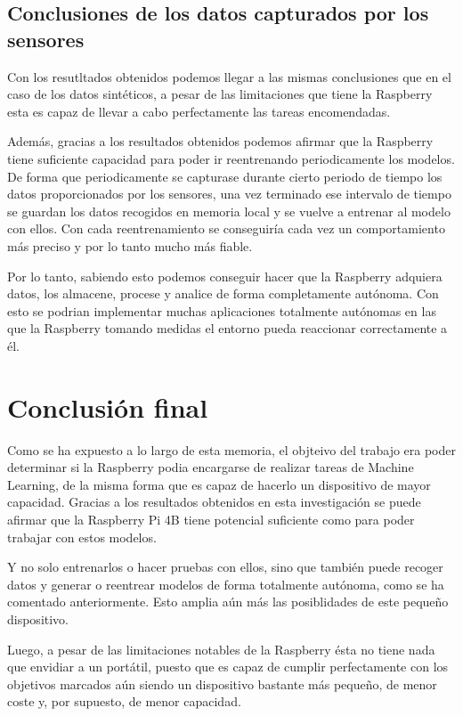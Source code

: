 \documentclass[a4paper, 12pt]{book}
\begin{document}
\subsection{Conclusiones de los datos capturados por los sensores}
\label{subsec:conclusiones_sensados}

Con los resutltados obtenidos podemos llegar a las mismas conclusiones que en el caso de los datos sintéticos, a pesar de las limitaciones que tiene la Raspberry esta es capaz de llevar a cabo perfectamente las tareas encomendadas.

Además, gracias a los resultados obtenidos podemos afirmar que la Raspberry tiene suficiente capacidad para poder ir reentrenando periodicamente los modelos. De forma que periodicamente se capturase durante cierto periodo de tiempo los datos proporcionados por los sensores, una vez terminado ese intervalo de tiempo se guardan los datos recogidos en memoria local y se vuelve a entrenar al modelo con ellos. Con cada reentrenamiento se conseguiría cada vez un comportamiento más preciso y por lo tanto mucho más fiable.

Por lo tanto, sabiendo esto podemos conseguir hacer que la Raspberry adquiera datos, los almacene, procese y analice de forma completamente autónoma. Con esto se podrian implementar muchas aplicaciones totalmente autónomas en las que la Raspberry tomando medidas el entorno pueda reaccionar correctamente a él.

\section{Conclusión final}
\label{sec:conclusion_final}

Como se ha expuesto a lo largo de esta memoria, el objteivo del trabajo era poder determinar si la Raspberry podia encargarse de realizar tareas de Machine Learning, de la misma forma que es capaz de hacerlo un dispositivo de mayor capacidad. Gracias a los resultados obtenidos en esta investigación se puede afirmar que la Raspberry Pi 4B tiene potencial suficiente como para poder trabajar con estos modelos.

Y no solo entrenarlos o hacer pruebas con ellos, sino que también puede recoger datos y generar o reentrear modelos de forma totalmente autónoma, como se ha comentado anteriormente. Esto amplia aún más las posiblidades de este pequeño dispositivo.

Luego, a pesar de las limitaciones notables de la Raspberry ésta no tiene nada que envidiar a un portátil, puesto que es capaz de cumplir perfectamente con los objetivos marcados aún siendo un dispositivo bastante más pequeño, de menor coste y, por supuesto, de menor capacidad.
\end{document}
